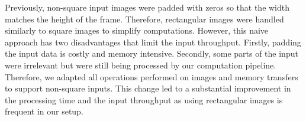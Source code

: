 Previously, non-square input images were padded with zeros so that the width matches the height of the frame. Therefore, rectangular images were handled similarly to square images to simplify computations. However, this naive approach has two disadvantages that limit the input throughput. Firstly, padding the input data is costly and memory intensive. Secondly, some parts of the input were irrelevant but were still being processed by our computation pipeline. Therefore, we adapted all operations performed on images and memory transfers to support non-square inputs. This change led to a substantial improvement in the processing time and the input throughput as using rectangular images is frequent in our setup.